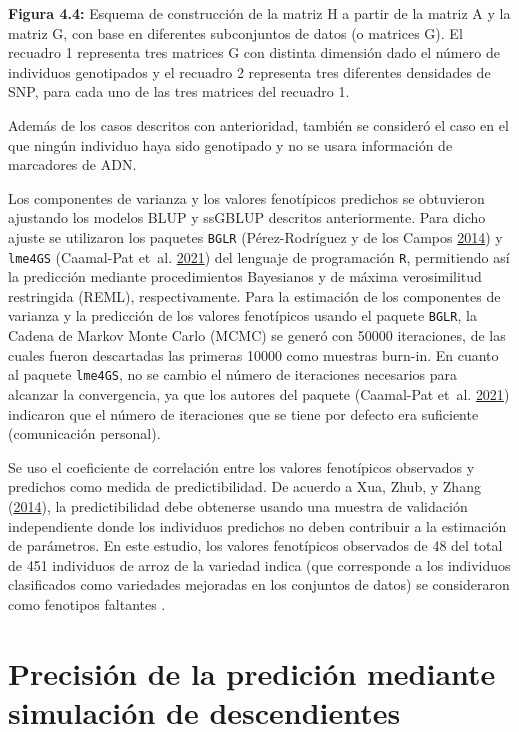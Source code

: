 \documentclass[11pt,spanish,a4paper,oneside,]{book} %
\begin{document}
\noindent
\textbf{Figura 4.4:} Esquema de construcción de la matriz H a partir de la matriz A y la matriz G, con base en diferentes subconjuntos de datos (o matrices G). El recuadro 1 representa tres matrices G con distinta dimensión dado el número de individuos genotipados y el recuadro 2 representa tres diferentes densidades de SNP, para cada uno de las tres matrices del recuadro 1.

\hspace*{1em}

Además de los casos descritos con anterioridad, también se consideró el caso en el que ningún individuo haya sido genotipado y no se usara información de marcadores de ADN.

Los componentes de varianza y los valores fenotípicos predichos se obtuvieron ajustando los modelos BLUP y ssGBLUP descritos anteriormente. Para dicho ajuste se utilizaron los paquetes \texttt{BGLR} (Pérez-Rodríguez y de los Campos \protect\hyperlink{ref-cite:50}{2014}) y \texttt{lme4GS} (Caamal-Pat et~al. \protect\hyperlink{ref-cite:51}{2021}) del lenguaje de programación \texttt{R}, permitiendo así la predicción mediante procedimientos Bayesianos y de máxima verosimilitud restringida (REML), respectivamente. Para la estimación de los componentes de varianza y la predicción de los valores fenotípicos usando el paquete \texttt{BGLR}, la Cadena de Markov Monte Carlo (MCMC) se generó con 50000 iteraciones, de las cuales fueron descartadas las primeras 10000 como muestras burn-in. En cuanto al paquete \texttt{lme4GS}, no se cambio el número de iteraciones necesarios para alcanzar la convergencia, ya que los autores del paquete (Caamal-Pat et~al. \protect\hyperlink{ref-cite:51}{2021}) indicaron que el número de iteraciones que se tiene por defecto era suficiente (comunicación personal).

Se uso el coeficiente de correlación entre los valores fenotípicos observados y predichos como medida de predictibilidad. De acuerdo a Xua, Zhub, y Zhang (\protect\hyperlink{ref-cite:25}{2014}), la predictibilidad debe obtenerse usando una muestra de validación independiente donde los individuos predichos no deben contribuir a la estimación de parámetros. En este estudio, los valores fenotípicos observados de 48 del total de 451 individuos de arroz de la variedad indica (que corresponde a los individuos clasificados como variedades mejoradas en los conjuntos de datos) se consideraron como fenotipos faltantes .

\hypertarget{precisiuxf3n-de-la-prediciuxf3n-mediante-simulaciuxf3n-de-descendientes}{%
\section{Precisión de la predición mediante simulación de descendientes}\label{precisiuxf3n-de-la-prediciuxf3n-mediante-simulaciuxf3n-de-descendientes}}
\end{document}

